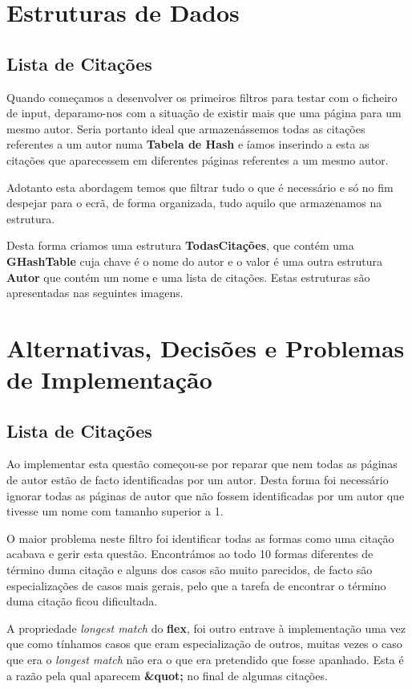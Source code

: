 \documentclass[11pt,a4paper]{report}
\begin{document}
\section{Estruturas de Dados}
\subsection{Lista de Citações}

Quando começamos a desenvolver os primeiros filtros para testar com o ficheiro de input, deparamo-nos com a situação de existir mais que uma página para um mesmo autor. Seria portanto ideal que armazenássemos todas as citações referentes a um autor numa \textbf{Tabela de Hash} e íamos inserindo a esta as citações que aparecessem em diferentes páginas referentes a um mesmo autor.

Adotanto esta abordagem temos que filtrar tudo o que é necessário e só no fim despejar para o ecrã, de forma organizada, tudo aquilo que armazenamos na estrutura.

Desta forma criamos uma estrutura \textbf{TodasCitações}, que contém uma \textbf{GHashTable} cuja chave é o nome do autor e o valor é uma outra estrutura \textbf{Autor} que contém um nome e uma lista de citações. Estas estruturas são apresentadas nas seguintes imagens.


\section{Alternativas, Decisões e Problemas de Implementação}

\subsection{Lista de Citações}

Ao implementar esta questão começou-se por reparar que nem todas as páginas de autor estão de facto identificadas por um autor. Desta forma foi necessário ignorar todas as páginas de autor que não fossem identificadas por um autor que tivesse um nome com tamanho superior a 1.

O maior problema neste filtro foi identificar todas as formas como uma citação acabava e gerir esta questão. Encontrámos ao todo 10 formas diferentes de término duma citação e alguns dos casos são muito parecidos, de facto são especializações de casos mais gerais, pelo que a tarefa de encontrar o término duma citação ficou dificultada.

A propriedade \emph{longest match} do \textbf{flex}, foi outro entrave à implementação uma vez que como tínhamos casos que eram especialização de outros, muitas vezes o caso que era o \emph{longest match} não era o que era pretendido que fosse apanhado. Esta é a razão pela qual aparecem \textbf{\&quot;} no final de algumas citações.
\end{document}
